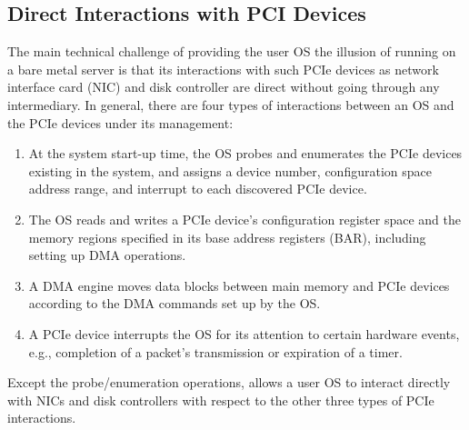 \subsection{Direct Interactions with PCI Devices}

The main technical challenge of providing the user OS the illusion of running on a bare metal server is that its interactions with such PCIe devices as network 
interface card (NIC) and disk controller are direct without going through any intermediary.
In general, there are four types of interactions between an OS and the PCIe devices under its management:
\begin{enumerate} 
\setlength\itemsep{-0.04in}
\item At the system start-up time, the OS probes and enumerates the PCIe devices existing in the system, and assigns a device number, configuration space address range, and interrupt to each discovered PCIe device.

\item The OS reads and writes a PCIe device's configuration register space and the memory regions specified in its base address registers (BAR), including setting up DMA operations.

\item A DMA engine moves data blocks between main memory and PCIe devices according to the DMA commands set up by the OS.

\item A PCIe device interrupts the OS for its attention to certain hardware events, e.g., completion of a packet's transmission or expiration of a timer.

\end{enumerate}   
Except the probe/enumeration operations, \na allows a user OS to interact directly with NICs and disk controllers with respect to the other three types of PCIe interactions.


